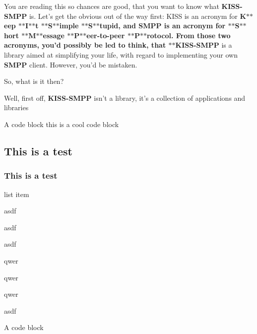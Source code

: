 You are reading this so chances are good, that you want to know what {\bfseries K\-I\-S\-S-\/\-S\-M\-P\-P} is. Let's get the obvious out of the way first\-: K\-I\-S\-S is an acronym for {\bfseries K$\ast$$\ast$eep $\ast$$\ast$\-I$\ast$$\ast$t $\ast$$\ast$\-S$\ast$$\ast$imple $\ast$$\ast$\-S$\ast$$\ast$tupid, and S\-M\-P\-P is an acronym for $\ast$$\ast$\-S$\ast$$\ast$hort $\ast$$\ast$\-M$\ast$$\ast$essage $\ast$$\ast$\-P$\ast$$\ast$eer-\/to-\/peer $\ast$$\ast$\-P$\ast$$\ast$rotocol. From those two acronyms, you'd possibly be led to think, that $\ast$$\ast$\-K\-I\-S\-S-\/\-S\-M\-P\-P} is a library aimed at simplifying your life, with regard to implementing your own {\bfseries S\-M\-P\-P} client. However, you'd be mistaken.

So, what is it then?

Well, first off, {\bfseries K\-I\-S\-S-\/\-S\-M\-P\-P} isn't a library, it's a collection of applications and libraries


\begin{DoxyCode}
A code block
\textcolor{keyword}{this} is a cool code block
\end{DoxyCode}


\subsection*{This is a test}

\subsubsection*{This is a test}


\begin{DoxyEnumerate}
\item list item
\begin{DoxyItemize}
\item asdf
\item asdf
\item asdf
\begin{DoxyItemize}
\item qwer
\item qwer
\item qwer
\end{DoxyItemize}
\item asdf
\end{DoxyItemize}
\end{DoxyEnumerate}


\begin{DoxyCode}
A code block
\end{DoxyCode}


